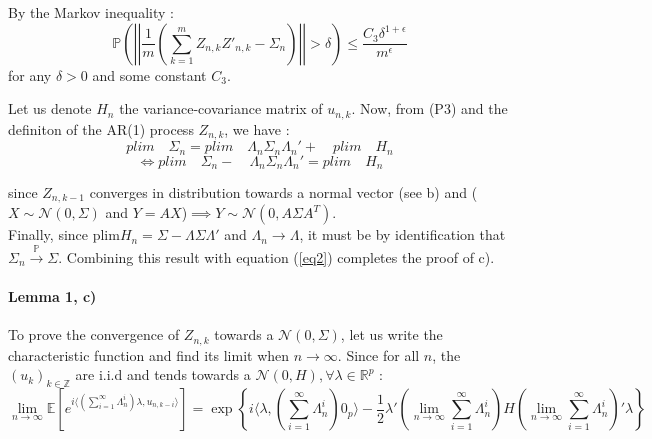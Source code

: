 \documentclass[11pt]{article}
\begin{document}
\medskip

By the Markov inequality : 
$$\mathbb{P}\left( \left|\left|\frac{1}{m} \left(\sum_{k=1}^m Z_{n,k}Z'_{n,k} - \Sigma_n \right)\right|\right| > \delta \right) \leq \frac{C_3 \delta^{1+\epsilon}}{m^{\epsilon}} $$
for any $\delta>0$ and some constant $C_3$.

Let us denote $H_n$ the variance-covariance matrix of $u_{n,k}$. Now, from (P3) and the definiton of the AR(1) process $Z_{n,k}$, we have :
$$ plim\quad \Sigma_n = plim \quad \Lambda_n \Sigma_n \Lambda_n' + \quad plim \quad H_n$$
$$ \iff plim \quad \Sigma_n - \quad \Lambda_n \Sigma_n \Lambda_n' = plim \quad H_n $$

since $Z_{n,k-1}$ converges in distribution towards a normal vector (see b) and ($X \sim \mathcal{N}(0,\Sigma)$ and $Y = AX$)$ \implies Y \sim \mathcal{N}(0, A\Sigma A^T)$. \\

Finally, since plim$H_n = \Sigma - \Lambda \Sigma \Lambda'$ and $\Lambda_n \to \Lambda$, it must be by identification that $\Sigma_n \overset{\mathbb{P}}{\to} \Sigma$. Combining this result with equation (\ref{eq2}) completes the proof of c). 

\paragraph{Lemma 1, c)} 

To prove the convergence of $Z_{n,k}$ towards a $\mathcal{N}(0,\Sigma)$, let us write the characteristic function and find its limit when $n\to\infty$. Since for all $n$, the $(u_k)_{k \in \mathbb{Z}}$ are i.i.d and tends towards a $\mathcal{N}(0,H), \forall \lambda \in \mathbb{R}^p$ :
\begin{equation}
\lim_{n\to\infty} \mathbb{E}\left[e^{i \langle \left(\sum_{i=1}^{\infty}\Lambda_n^i \right)\lambda, u_{n,k-i} \rangle} \right] = \exp\left\{{i\langle \lambda, \left(\sum_{i=1}^{\infty}\Lambda_n^i \right) 0_p \rangle - \frac{1}{2} \lambda' \left(\lim_{n\to\infty}\sum_{i=1}^{\infty}\Lambda_n^i \right) H \left(\lim_{n\to\infty}\sum_{i=1}^{\infty}\Lambda_n^i \right)'\lambda} \right\}
\end{equation}
\end{document}

